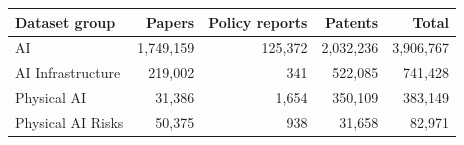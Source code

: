 \begin{tabular}{lrrrr}
\toprule
Dataset group & Papers & Policy reports & Patents & Total \\
\midrule
AI & 1,749,159 & 125,372 & 2,032,236 & 3,906,767 \\
AI Infrastructure & 219,002 & 341 & 522,085 & 741,428 \\
Physical AI & 31,386 & 1,654 & 350,109 & 383,149 \\
Physical AI Risks & 50,375 & 938 & 31,658 & 82,971 \\
\bottomrule
\end{tabular}
